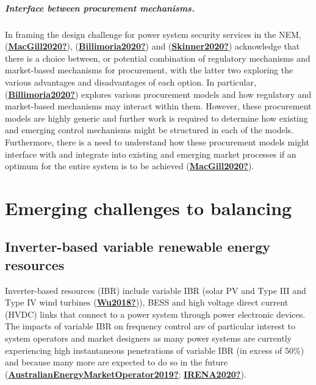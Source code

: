 \documentclass[12pt,a4paper,]{report}
\begin{document}
\hypertarget{interface-between-procurement-mechanisms.}{%
\subparagraph{Interface between procurement
mechanisms.}\label{interface-between-procurement-mechanisms.}}

In framing the design challenge for power system security services in
the NEM, (\protect\hyperlink{ref-MacGill2020}{\textbf{MacGill2020?}}),
(\protect\hyperlink{ref-Billimoria2020}{\textbf{Billimoria2020?}}) and
(\protect\hyperlink{ref-Skinner2020}{\textbf{Skinner2020?}}) acknowledge
that there is a choice between, or potential combination of regulatory
mechanisms and market-based mechanisms for procurement, with the latter
two exploring the various advantages and disadvantages of each option.
In particular,
(\protect\hyperlink{ref-Billimoria2020}{\textbf{Billimoria2020?}})
explores various procurement models and how regulatory and market-based
mechanisms may interact within them. However, these procurement models
are highly generic and further work is required to determine how
existing and emerging control mechanisms might be structured in each of
the models. Furthermore, there is a need to understand how these
procurement models might interface with and integrate into existing and
emerging market processes if an optimum for the entire system is to be
achieved (\protect\hyperlink{ref-MacGill2020}{\textbf{MacGill2020?}}).

\hypertarget{emerging-challenges-to-balancing}{%
\section{Emerging challenges to
balancing}\label{emerging-challenges-to-balancing}}

\hypertarget{inverter-based-variable-renewable-energy-resources}{%
\subsection{Inverter-based variable renewable energy
resources}\label{inverter-based-variable-renewable-energy-resources}}

Inverter-based resources (IBR) include variable IBR (solar PV and Type
III and Type IV wind turbines
(\protect\hyperlink{ref-Wu2018}{\textbf{Wu2018?}})), BESS and high
voltage direct current (HVDC) links that connect to a power system
through power electronic devices. The impacts of variable IBR on
frequency control are of particular interest to system operators and
market designers as many power systems are currently experiencing high
instantaneous penetrations of variable IBR (in excess of 50\%) and
because many more are expected to do so in the future
(\protect\hyperlink{ref-AustralianEnergyMarketOperator2019}{\textbf{AustralianEnergyMarketOperator2019?}};
\protect\hyperlink{ref-IRENA2020}{\textbf{IRENA2020?}}).
\end{document}
